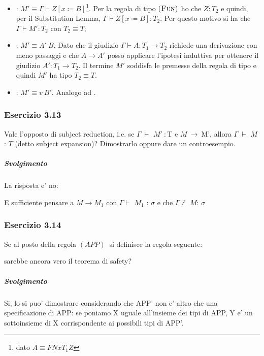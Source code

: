 \begin{description}
  \begin{itemize}
    \item {}: $M' \equiv{} \Gamma \vdash{}
      Z[x \coloneqq{} B]$\footnote{dato $A \equiv{} FN{x}{T_1}Z$}.
      Per la regola di tipo $\myrule{Fun}$ ho che $Z : T_2$ e quindi, per
       il Substitution Lemma, $\Gamma \vdash{} Z[x \coloneqq{} B] : T_2$. Per
      questo motivo si ha che $\Gamma \vdash{} M' : T_2$ con $T_2 \equiv T$;
    \item {}: $M' \equiv{} A'\: B$. Dato che il giudizio $\Gamma \vdash A : T_1 \to T_2$ richiede una derivazione con meno passaggi e che $A \to A'$ posso applicare l'ipotesi induttiva per ottenere il giudizio $A' : T_1 \to T_2$. Il termine $M'$ soddisfa le premesse della regola di tipo  e quindi $M'$ ha tipo $T_2 \equiv T$.

    \item {}: $M' \equiv{} v\: B'$. Analogo ad .
  \end{itemize}

 
\end{description}




\subsubsection*{Esercizio 3.13}

Vale l'opposto di subject reduction, i.e. se $\Gamma\:\vdash$ $M'\: :  $T e $M\:\rightarrow\:$M', allora $\Gamma\:\vdash$ $M$ : $T$ (detto subject expansion)? Dimostrarlo oppure dare un controesempio.
\subparagraph*{Svolgimento}
La risposta e' no:

E sufficiente pensare a $M \rightarrow M_1$ con $\Gamma\vdash$ $M_1$ : $\sigma$ e che 
$\Gamma\nvdash$ $M$: $\sigma$

\subsubsection*{Esercizio 3.14}
Se al posto della regola $(APP)\:$ si definisce la regola seguente:

\begin{prooftree} 
	
\end{prooftree} 

sarebbe ancora vero il teorema di safety?
\subparagraph*{Svolgimento}
Si, lo si puo' dimostrare considerando che APP' non e' altro che una specificazione di APP: se poniamo X uguale all'insieme dei tipi di APP, Y e' un sottoinsieme di X corrispondente ai possibili tipi di APP'.

